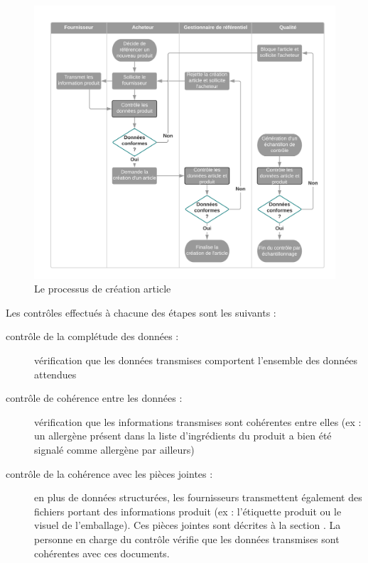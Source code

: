             \begin{figure}[htpb]
                \begin{center}
                \includegraphics[width=\linewidth]{img/Processus de creation article.png}
                \end{center}
                \caption{Le processus de création article}
                \label{fig:processus_article}
            \end{figure}    

            Les contrôles effectués à chacune des étapes sont les suivants : 
            \begin{description}
                \item[contrôle de la complétude des données :] vérification que les données transmises comportent l'ensemble des données attendues
                \item[contrôle de cohérence entre les données :] vérification que les informations transmises sont cohérentes entre elles (ex : un allergène présent dans la liste d'ingrédients du produit a bien été signalé comme allergène par ailleurs)
                \item[contrôle de la cohérence avec les pièces jointes :] en plus de données structurées, les fournisseurs transmettent également des fichiers portant des informations produit (ex : l'étiquette produit ou le visuel de l'emballage). Ces pièces jointes sont décrites à la section . La personne en charge du contrôle vérifie que les données transmises sont cohérentes avec ces documents.
            \end{description}

